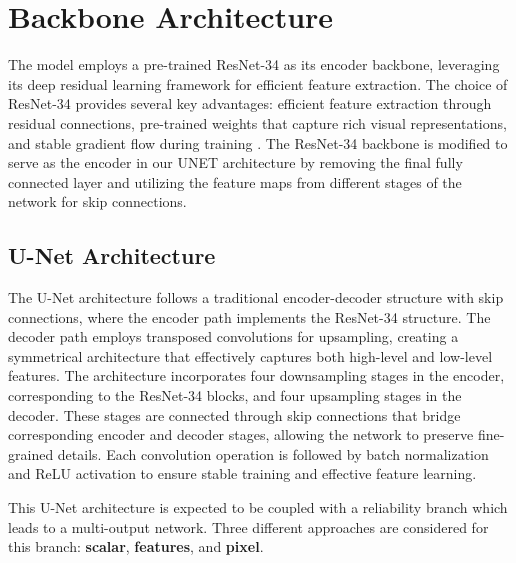 \section{Backbone Architecture}

The model employs a pre-trained ResNet-34 as its encoder backbone,
leveraging its deep residual learning framework for efficient feature
extraction. The choice of ResNet-34 provides several key advantages:
efficient feature extraction through residual connections,
pre-trained weights that capture rich visual representations, and
stable gradient flow during training \cite{HeEtAl2015}. The
ResNet-34 backbone is modified to serve as the encoder in our UNET
architecture by removing the final fully connected layer and
utilizing the feature maps from different stages of the network for
skip connections.

\subsection{U-Net Architecture}

The U-Net architecture follows a traditional encoder-decoder structure
with skip connections, where the encoder path implements the
ResNet-34 structure. The decoder path employs transposed convolutions
for upsampling, creating a symmetrical architecture that effectively
captures both high-level and low-level features. The architecture
incorporates four downsampling stages in the encoder, corresponding
to the ResNet-34 blocks, and four upsampling stages in the decoder.
These stages are connected through skip connections that bridge
corresponding encoder and decoder stages, allowing the network to
preserve fine-grained details. Each convolution operation is followed
by batch normalization and ReLU activation to ensure stable training
and effective feature learning.

This U-Net architecture is expected to be coupled with a reliability
branch which leads to a multi-output network. Three different approaches
are considered for this branch: \textbf{scalar}, \textbf{features},
and \textbf{pixel}.
